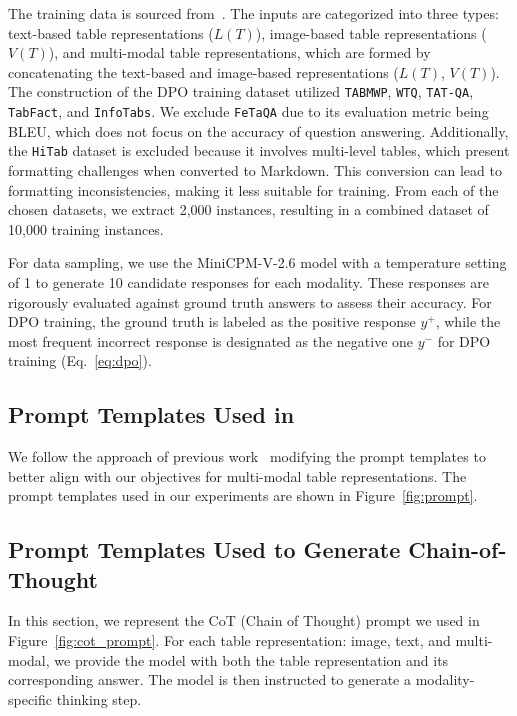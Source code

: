 The training data is sourced from~\citet{ZhengFSS0J024}. The inputs are categorized into three types: text-based table representations ($L(T)$), image-based table representations ($V(T)$), and multi-modal table representations, which are formed by concatenating the text-based and image-based representations ($L(T)$, $V(T)$). The construction of the DPO training dataset utilized \texttt{TABMWP}, \texttt{WTQ}, \texttt{TAT-QA}, \texttt{TabFact}, and \texttt{InfoTabs}. We exclude \texttt{FeTaQA} due to its evaluation metric being BLEU, which does not focus on the accuracy of question answering. Additionally, the \texttt{HiTab} dataset is excluded because it involves multi-level tables, which present formatting challenges when converted to Markdown. This conversion can lead to formatting inconsistencies, making it less suitable for training. From each of the chosen datasets, we extract 2,000 instances, resulting in a combined dataset of 10,000 training instances.

For data sampling, we use the MiniCPM-V-2.6 model with a temperature setting of 1 to generate 10 candidate responses for each modality. These responses are rigorously evaluated against ground truth answers to assess their accuracy. For DPO training, the ground truth is labeled as the positive response $y^+$, while the most frequent incorrect response is designated as the negative one $y^-$ for DPO training (Eq.~\ref{eq:dpo}).


\subsection{Prompt Templates Used in \method{}} \label{app:hippo_prompt}
We follow the approach of previous work~\cite{ZhengFSS0J024} modifying the prompt templates to better align with our objectives for multi-modal table representations. The prompt templates used in our experiments are shown in Figure~\ref{fig:prompt}.

\subsection{Prompt Templates Used to Generate Chain-of-Thought}\label{app:cot_prompt}
In this section, we represent the CoT (Chain of Thought) prompt we used in Figure~\ref{fig:cot_prompt}. For each table representation: image, text, and multi-modal, we provide the model with both the table representation and its corresponding answer. The model is then instructed to generate a modality-specific thinking step.

